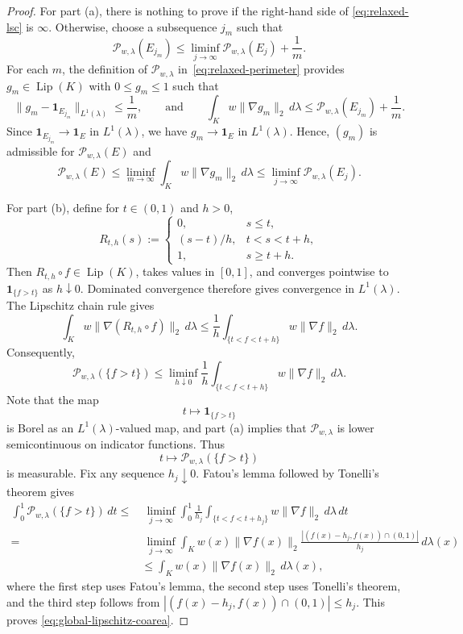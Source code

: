 \documentclass[11pt]{article}
\theoremstyle{definition}
\theoremstyle{remark}
\begin{document}
\begin{proof}
For part \textup{(a)}, there is nothing to prove if the right-hand side
of \eqref{eq:relaxed-lsc} is $\infty$.  Otherwise, choose a subsequence \(j_m\) such that
\[
 \mathcal P_{w,\lambda}(E_{j_m})\le \liminf_{j\to\infty}\mathcal P_{w,\lambda}(E_j)+\frac1m.
\]
For each \(m\), the definition of $\mathcal P_{w,\lambda}$ in~\eqref{eq:relaxed-perimeter} provides \(g_m\in\operatorname{Lip}(K)\) with \(0\le g_m\le1\) such that
\[
 \|g_m-\mathbf1_{E_{j_m}}\|_{L^1(\lambda)}\le\frac1m,\qquad \text{and}\qquad 
 \int_Kw\|\nabla g_m\|_2\,d\lambda
 \le
 \mathcal P_{w,\lambda}(E_{j_m})+\frac1m.
\]
Since \(\mathbf1_{E_{j_m}}\to\mathbf1_E\) in \(L^1(\lambda)\), we have
\(g_m\to\mathbf1_E\) in \(L^1(\lambda)\).  Hence, $(g_m)$ is admissible for $\mathcal P_{w,\lambda}(E)$ and
\[
 \mathcal P_{w,\lambda}(E)
 \le
 \liminf_{m\to\infty}
 \int_Kw\|\nabla g_m\|_2\,d\lambda
 \le \liminf_{j\to\infty}\mathcal P_{w,\lambda}(E_j).
\]


For part \textup{(b)}, define for \(t\in(0,1)\) and \(h>0\), 
\[
 R_{t,h}(s)
 :=
 \begin{cases}
 0, & s\le t,\\[1mm]
 (s-t)/h, & t<s<t+h,\\[1mm]
 1, & s\ge t+h.
 \end{cases}
\]
Then \(R_{t,h}\circ f\in\operatorname{Lip}(K)\), takes values in
\([0,1]\), and converges pointwise to \(\mathbf1_{\{f>t\}}\) as
\(h\downarrow0\).  Dominated convergence therefore gives convergence in
\(L^1(\lambda)\).  The Lipschitz chain rule gives
\[
 \int_K
 w\|\nabla(R_{t,h}\circ f)\|_2\,d\lambda
 \le
 \frac1h
 \int_{\{t<f<t+h\}}
 w\|\nabla f\|_2\,d\lambda.
\]
Consequently,
\begin{equation}\label{eq:ramp-upper-bound}
 \mathcal P_{w,\lambda}(\{f>t\})
 \le
 \liminf_{h\downarrow0}
 \frac1h
 \int_{\{t<f<t+h\}}
 w\|\nabla f\|_2\,d\lambda.
\end{equation}
Note that the map
\[
 t\longmapsto\mathbf1_{\{f>t\}}
\]
is Borel as an \(L^1(\lambda)\)-valued map, and part \textup{(a)} implies
that \(\mathcal P_{w,\lambda}\) is lower semicontinuous on indicator functions.
Thus
\[
 t\longmapsto\mathcal P_{w,\lambda}(\{f>t\})
\]
is measurable.  Fix any sequence \(h_j\downarrow0\).  Fatou's lemma followed by Tonelli's theorem gives
\begin{align*}
 \int_0^1\mathcal P_{w,\lambda}(\{f>t\})\,dt \le &~ 
 \liminf_{j\to\infty}
 \int_0^1
 \frac1{h_j}
 \int_{\{t<f<t+h_j\}}
 w\|\nabla f\|_2\,d\lambda\,dt\\
 = &~ 
 \liminf_{j\to\infty}
 \int_K
 w(x)\|\nabla f(x)\|_2
 \frac{
   |(f(x)-h_j,f(x))\cap(0,1)|
 }{h_j}
 \,d\lambda(x)\\
 &\le
 \int_Kw(x)\|\nabla f(x)\|_2\,d\lambda(x),
\end{align*}
where the first step uses Fatou's lemma, the second step uses Tonelli's theorem, and the third step follows from $|(f(x)-h_j,f(x))\cap (0,1)|\leq h_j$.  This proves \eqref{eq:global-lipschitz-coarea}.
\end{proof}
\end{document}
